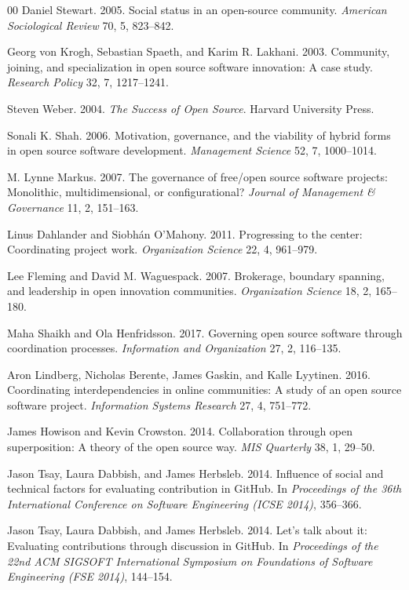 \documentclass[sigconf,screen]{acmart}
\begin{document}
\begin{thebibliography}{00}
Daniel Stewart. 2005. Social status in an open-source community. \emph{American Sociological Review} 70, 5, 823--842.

Georg von Krogh, Sebastian Spaeth, and Karim R. Lakhani. 2003. Community, joining, and specialization in open source software innovation: A case study. \emph{Research Policy} 32, 7, 1217--1241.

Steven Weber. 2004. \emph{The Success of Open Source}. Harvard University Press.

Sonali K. Shah. 2006. Motivation, governance, and the viability of hybrid forms in open source software development. \emph{Management Science} 52, 7, 1000--1014.

M. Lynne Markus. 2007. The governance of free/open source software projects: Monolithic, multidimensional, or configurational? \emph{Journal of Management \& Governance} 11, 2, 151--163.

Linus Dahlander and Siobh\'an O'Mahony. 2011. Progressing to the center: Coordinating project work. \emph{Organization Science} 22, 4, 961--979.

Lee Fleming and David M. Waguespack. 2007. Brokerage, boundary spanning, and leadership in open innovation communities. \emph{Organization Science} 18, 2, 165--180.

Maha Shaikh and Ola Henfridsson. 2017. Governing open source software through coordination processes. \emph{Information and Organization} 27, 2, 116--135.

Aron Lindberg, Nicholas Berente, James Gaskin, and Kalle Lyytinen. 2016. Coordinating interdependencies in online communities: A study of an open source software project. \emph{Information Systems Research} 27, 4, 751--772.

James Howison and Kevin Crowston. 2014. Collaboration through open superposition: A theory of the open source way. \emph{MIS Quarterly} 38, 1, 29--50.

Jason Tsay, Laura Dabbish, and James Herbsleb. 2014. Influence of social and technical factors for evaluating contribution in GitHub. In \emph{Proceedings of the 36th International Conference on Software Engineering (ICSE 2014)}, 356--366.

Jason Tsay, Laura Dabbish, and James Herbsleb. 2014. Let's talk about it: Evaluating contributions through discussion in GitHub. In \emph{Proceedings of the 22nd ACM SIGSOFT International Symposium on Foundations of Software Engineering (FSE 2014)}, 144--154.


\end{thebibliography}
\end{document}
